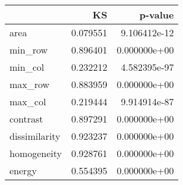 \begin{tabular}{lrr}
\toprule
{} &        KS &       p-value \\
\midrule
area          &  0.079551 &  9.106412e-12 \\
min\_row       &  0.896401 &  0.000000e+00 \\
min\_col       &  0.232212 &  4.582395e-97 \\
max\_row       &  0.883959 &  0.000000e+00 \\
max\_col       &  0.219444 &  9.914914e-87 \\
contrast      &  0.897291 &  0.000000e+00 \\
dissimilarity &  0.923237 &  0.000000e+00 \\
homogeneity   &  0.928761 &  0.000000e+00 \\
energy        &  0.554395 &  0.000000e+00 \\
\bottomrule
\end{tabular}

